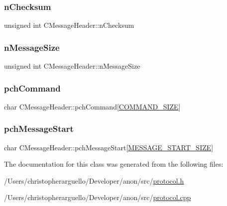 \subsubsection{\texorpdfstring{n\+Checksum}{nChecksum}}
{\footnotesize\ttfamily unsigned int C\+Message\+Header\+::n\+Checksum}

\mbox{\label{class_c_message_header_a67ccb9f1f23af69e309a8d6c8bfff751}} 
\subsubsection{\texorpdfstring{n\+Message\+Size}{nMessageSize}}
{\footnotesize\ttfamily unsigned int C\+Message\+Header\+::n\+Message\+Size}

\mbox{\label{class_c_message_header_a87d62b0d9afb3889f318991700a34431}} 
\subsubsection{\texorpdfstring{pch\+Command}{pchCommand}}
{\footnotesize\ttfamily char C\+Message\+Header\+::pch\+Command\mbox{[}\mbox{\hyperlink{class_c_message_header_a44037297cb6e6b432e2386c351ce05dda8c1bfc0fa6a63c8b73abef30555a5e54}{C\+O\+M\+M\+A\+N\+D\+\_\+\+S\+I\+ZE}}\mbox{]}}

\mbox{\label{class_c_message_header_a4284bf1d2fd792af89e1c93b7e6e274e}} 
\subsubsection{\texorpdfstring{pch\+Message\+Start}{pchMessageStart}}
{\footnotesize\ttfamily char C\+Message\+Header\+::pch\+Message\+Start\mbox{[}\mbox{\hyperlink{protocol_8h_a6bcadada595cc3da13e6a04be1715917}{M\+E\+S\+S\+A\+G\+E\+\_\+\+S\+T\+A\+R\+T\+\_\+\+S\+I\+ZE}}\mbox{]}}



The documentation for this class was generated from the following files\+:\begin{DoxyCompactItemize}
\item 
/\+Users/christopherarguello/\+Developer/anon/src/\mbox{\hyperlink{protocol_8h}{protocol.\+h}}\item 
/\+Users/christopherarguello/\+Developer/anon/src/\mbox{\hyperlink{protocol_8cpp}{protocol.\+cpp}}\end{DoxyCompactItemize}
